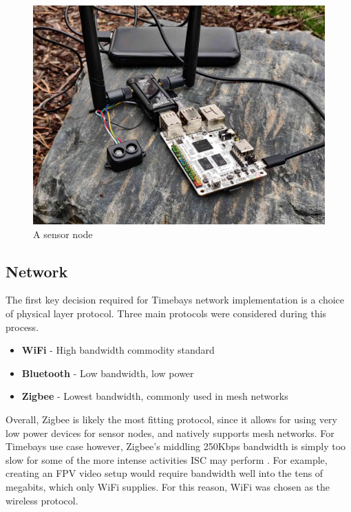 \documentclass[journal]{IEEEtran}
\begin{document}
\begin{figure}[t]
    \centering
    \includegraphics[width=\linewidth]{images/sensor_node.jpg}
    \caption{A sensor node}
    \label{fig:node}
\end{figure}


\subsection{Network}

The first key decision required for Timebays network implementation is a choice of physical layer protocol. Three main protocols were considered during this process.

\begin{itemize}
    \item \textbf{WiFi} - High bandwidth commodity standard
    \item \textbf{Bluetooth} - Low bandwidth, low power
    \item \textbf{Zigbee} - Lowest bandwidth, commonly used in mesh networks
\end{itemize}

Overall, Zigbee is likely the most fitting protocol, since it allows for using very low power devices for sensor nodes, and natively supports mesh networks. For Timebays use case however, Zigbee's middling 250Kbps bandwidth is simply too slow for some of the more intense activities ISC may perform \cite{haque_abdelgawad_yelamarthi_2022}. For example, creating an FPV video setup would require bandwidth well into the tens of megabits, which only WiFi supplies. For this reason, WiFi was chosen as the wireless protocol.
\end{document}
